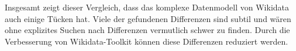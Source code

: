 Insgesamt zeigt dieser Vergleich, dass das komplexe Datenmodell von Wikidata auch einige Tücken hat.
Viele der gefundenen Differenzen sind subtil und wären ohne explizites Suchen nach Differenzen vermutlich schwer zu finden.
Durch die Verbesserung von Wikidata-Toolkit können diese Differenzen reduziert werden.
% 
% 
% 
% 
% 
% 
